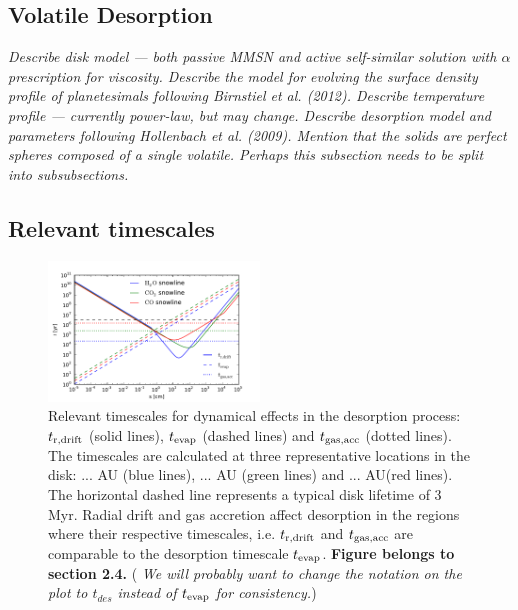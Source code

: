 \documentclass[apj]{emulateapj}
\newcommand{\emgr}[1]{\emph{ \color{gray} #1}}
\begin{document}
\subsection{Volatile Desorption}
\label{sec:desorption}


\emgr{Describe disk model --- both passive MMSN and active self-similar solution with $\alpha$ prescription for viscosity. Describe the model for evolving the surface density profile of planetesimals following Birnstiel et al. (2012). Describe temperature profile --- currently power-law, but may change. Describe desorption model and parameters following Hollenbach et al. (2009). Mention that the solids are perfect spheres composed of a single volatile. Perhaps this subsection needs to be split into subsubsections.}

\subsection{Relevant timescales}

\begin{figure}[h!]
\centering
\includegraphics[width=0.5\textwidth]{../../figs/drift_timescales_betaS1_gas_acc_new.pdf}
\caption{Relevant timescales for dynamical effects in the desorption process: $t_{\rm r, drift}$ (solid lines), $t_{\rm evap}$ (dashed lines) and $t_{\rm gas, acc}$ (dotted lines). The timescales are calculated at three representative locations in the disk: ... AU (blue lines), ... AU (green lines) and ... AU(red lines). The horizontal dashed line represents a typical disk lifetime of 3 Myr. Radial drift and gas accretion affect desorption in the regions where their respective timescales, i.e. $t_{\rm r, drift}$ and $t_{\rm gas, acc}$ are comparable to the desorption timescale $t_{\rm evap}$. \textbf{Figure belongs to section 2.4.} (\emgr{We will probably want to change the notation on the plot to $t_{des}$ instead of $t_{\rm evap}$ for consistency.})}  %
\label{fig:timescales}
\end{figure}
\end{document}
